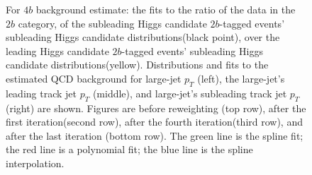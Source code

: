 \begin{figure}[htbp!]
\begin{center}
\caption{For $4b$ background estimate: the fits to the ratio of the data in the $2b$ category, of the subleading Higgs candidate $2b$-tagged events' subleading Higgs candidate distributions(black point), over the leading Higgs candidate $2b$-tagged events' subleading Higgs candidate distributions(yellow). Distributions and fits to the estimated QCD background for large-\R jet $p_{T}$ (left),  the large-\R jet's leading track jet $p_T$ (middle), and large-\R jet's subleading track jet $p_T$ (right) are shown.  Figures are before reweighting (top row), after the first iteration(second row), after the fourth iteration(third row), and after the last iteration (bottom row). The green line is the spline fit; the red line is a polynomial fit; the blue line is the spline interpolation.}
\label{fig:rw-4b-lead}
\end{center}
\end{figure}

